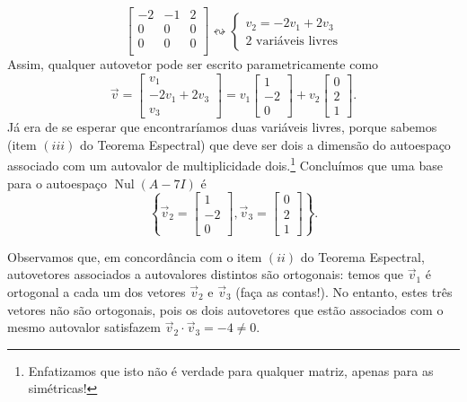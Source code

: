 \begin{ex}
\begin{itemize}
\begin{equation}
		\begin{bmatrix}
		-2 & -1 & 2 \\
		0 & 0 & 0 \\
		0 & 0 & 0 \\
		\end{bmatrix} \leftrightsquigarrow
		\left\lbrace
		\begin{array}{l}
		v_2 = - 2 v_1 + 2 v_3  \\
		\text{2 variáveis livres}
		\end{array}
		\right.
		\end{equation} Assim, qualquer autovetor pode ser escrito parametricamente como
		\begin{equation}
		\vec{v} =
		\begin{bmatrix}
		v_1 \\
		- 2 v_1 + 2v_3 \\
		v_3
		\end{bmatrix} = v_1
		\begin{bmatrix}
		1 \\ -2 \\ 0
		\end{bmatrix} + v_2
		\begin{bmatrix}
		0 \\ 2 \\ 1
		\end{bmatrix}.
		\end{equation} Já era de se esperar que encontraríamos duas variáveis livres, porque sabemos (item $(iii)$ do Teorema Espectral) que deve ser dois a dimensão do autoespaço associado com um autovalor de multiplicidade dois.\footnote{Enfatizamos que isto não é verdade para qualquer matriz, apenas para as simétricas!} Concluímos que uma base para o autoespaço $\operatorname{Nul} (A - 7I)$ é
		\begin{equation}
		\left\lbrace
		\vec{v}_2 = \begin{bmatrix}
		1 \\ -2 \\ 0
		\end{bmatrix}, \vec{v}_3 =
		\begin{bmatrix}
		0 \\ 2 \\ 1
		\end{bmatrix}
		\right\rbrace.
		\end{equation}
	\end{itemize}

	Observamos que, em concordância com o item $(ii)$ do Teorema Espectral, autovetores associados a autovalores distintos são ortogonais: temos que $\vec{v}_1$ é ortogonal a cada um dos vetores $\vec{v}_2$ e $\vec{v}_3$ (faça as contas!). No entanto, estes três vetores não são ortogonais, pois os dois autovetores que estão associados com o mesmo autovalor satisfazem $\vec{v}_2 \cdot \vec{v}_3 = -4 \neq 0.$


\end{ex}
